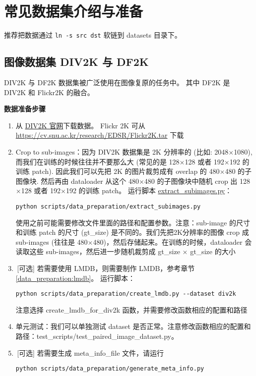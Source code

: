 \documentclass[../main.tex]{subfiles}
\begin{document}
\section{常见数据集介绍与准备}\label{data_preparation:dataset}

推荐把数据通过 \texttt{ln -s src dst} 软链到 datasets 目录下。

\subsection{图像数据集 DIV2K 与 DF2K}

DIV2K 与 DF2K 数据集被广泛使用在图像复原的任务中。
其中 DF2K 是 DIV2K 和 Flickr2K 的融合。

\noindent\textbf{数据准备步骤}
\begin{enumerate}
    \item 从 \href{https://data.vision.ee.ethz.ch/cvl/DIV2K}{DIV2K 官网}下载数据。 Flickr 2K 可从 \url{https://cv.snu.ac.kr/research/EDSR/Flickr2K.tar} 下载
    \item Crop to sub-images：因为 DIV2K 数据集是 2K 分辨率的 (比如: 2048$\times$1080), 而我们在训练的时候往往并不要那么大 (常见的是 128$\times$128 或者 192$\times$192 的训练 patch). 因此我们可以先把 2K 的图片裁剪成有 overlap 的 480$\times$480 的子图像块. 然后再由 dataloader 从这个 480$\times$480 的子图像块中随机 crop 出 128$\times$128 或者 192$\times$192 的训练 patch。
          运行脚本 \href{https://github.com/XPixelGroup/BasicSR/blob/master/scripts/data_preparation/extract_subimages.py}{extract\_subimages.py}：
          \begin{verbatim}
python scripts/data_preparation/extract_subimages.py
\end{verbatim}
          使用之前可能需要修改文件里面的路径和配置参数。注意：sub-image 的尺寸和训练 patch 的尺寸 (gt\_size) 是不同的。我们先把2K分辨率的图像 crop 成 sub-images (往往是 480$\times$480)，然后存储起来。在训练的时候，dataloader 会读取这些 sub-images，然后进一步随机裁剪成 gt\_size $\times$ gt\_size 的大小
    \item\,[可选] 若需要使用 LMDB，则需要制作 LMDB，参考章节\ref{data_preparation:lmdb}。
          运行脚本：
          \begin{verbatim}
python scripts/data_preparation/create_lmdb.py --dataset div2k
\end{verbatim}
          注意选择 create\_lmdb\_for\_div2k 函数，并需要修改函数相应的配置和路径
    \item 单元测试：我们可以单独测试 dataset 是否正常。注意修改函数相应的配置和路径：test\_scripts/test\_paired\_image\_dataset.py。
    \item\,[可选] 若需要生成 meta\_info\_file 文件，请运行
          \begin{verbatim}
python scripts/data_preparation/generate_meta_info.py
\end{verbatim}
\end{enumerate}
\end{document}
